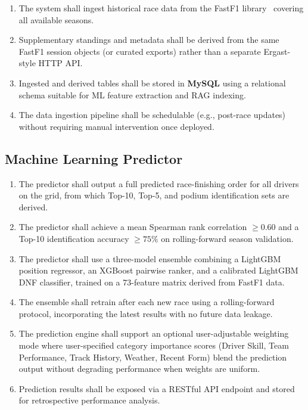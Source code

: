 \documentclass[12pt, a4paper, oneside]{report}
\begin{document}
\begin{enumerate}[leftmargin=*,label=FR-D\arabic*.]
  \item The system shall ingest historical race data from the FastF1
        library~\cite{fastF1} covering all available seasons.
  \item Supplementary standings and metadata shall be derived from the same
        FastF1 session objects (or curated exports) rather than a separate
        Ergast-style HTTP API.
  \item Ingested and derived tables shall be stored in \textbf{MySQL} using a
        relational schema suitable for ML feature extraction and RAG indexing.
  \item The data ingestion pipeline shall be schedulable (e.g., post-race
        updates) without requiring manual intervention once deployed.
\end{enumerate}

\subsection{Machine Learning Predictor}

\begin{enumerate}[leftmargin=*,label=FR-ML\arabic*.]
  \item The predictor shall output a full predicted race-finishing order for
        all drivers on the grid, from which Top-10, Top-5, and podium
        identification sets are derived.
  \item The predictor shall achieve a mean Spearman rank correlation $\geq 0.60$
        and a Top-10 identification accuracy $\geq 75\%$ on rolling-forward
        season validation.
  \item The predictor shall use a three-model ensemble combining a LightGBM
        position regressor, an XGBoost pairwise ranker, and a calibrated
        LightGBM DNF classifier, trained on a 73-feature matrix derived from
        FastF1 data.
  \item The ensemble shall retrain after each new race using a rolling-forward
        protocol, incorporating the latest results with no future data leakage.
  \item The prediction engine shall support an optional user-adjustable weighting
        mode where user-specified category importance scores (Driver Skill, Team
        Performance, Track History, Weather, Recent Form) blend the prediction
        output without degrading performance when weights are uniform.
  \item Prediction results shall be exposed via a RESTful API endpoint and
        stored for retrospective performance analysis.
\end{enumerate}
\end{document}
